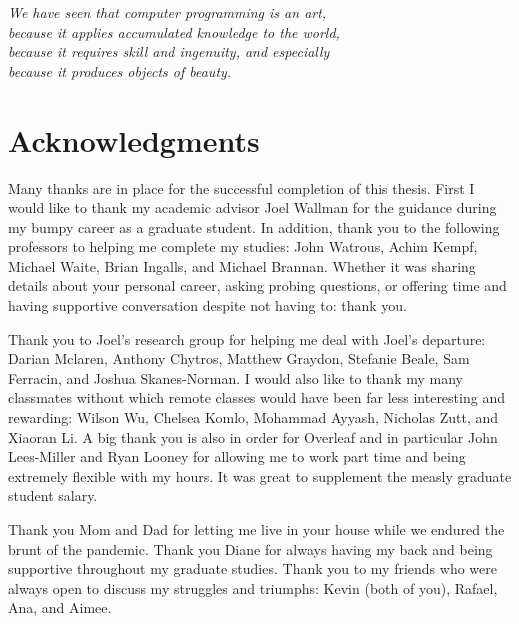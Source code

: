 
\begin{flushright}{\slshape %
        We have seen that computer programming is an art, \\
        because it applies accumulated knowledge to the world, \\
        because it requires skill and ingenuity, and especially \\
        because it produces objects of beauty.} \\ \medskip
\end{flushright}



\bigskip

\begingroup
\let\clearpage\relax
\let\cleardoublepage\relax
\let\cleardoublepage\relax

\chapter*{Acknowledgments}

Many thanks are in place for the successful completion of this thesis.
First I would like to thank my academic advisor Joel Wallman for the guidance during my bumpy career as a graduate student.
In addition, thank you to the following professors to helping me complete my studies: John Watrous, Achim Kempf, Michael Waite, Brian Ingalls, and Michael Brannan.
Whether it was sharing details about your personal career, asking probing questions, or offering time and having supportive conversation despite not having to: thank you.

Thank you to Joel's research group for helping me deal with Joel's departure: Darian Mclaren, Anthony Chytros, Matthew Graydon, Stefanie Beale, Sam Ferracin, and Joshua Skanes-Norman.
I would also like to thank my many classmates without which remote classes would have been far less interesting and rewarding: Wilson Wu, Chelsea Komlo, Mohammad Ayyash, Nicholas Zutt, and Xiaoran Li.
A big thank you is also in order for Overleaf and in particular John Lees-Miller and Ryan Looney for allowing me to work part time and being extremely flexible with my hours.
It was great to supplement the measly graduate student salary.

Thank you Mom and Dad for letting me live in your house while we endured the brunt of the pandemic.
Thank you Diane for always having my back and being supportive throughout my graduate studies.
Thank you to my friends who were always open to discuss my struggles and triumphs: Kevin (both of you), Rafael, Ana, and Aimee.

\endgroup

